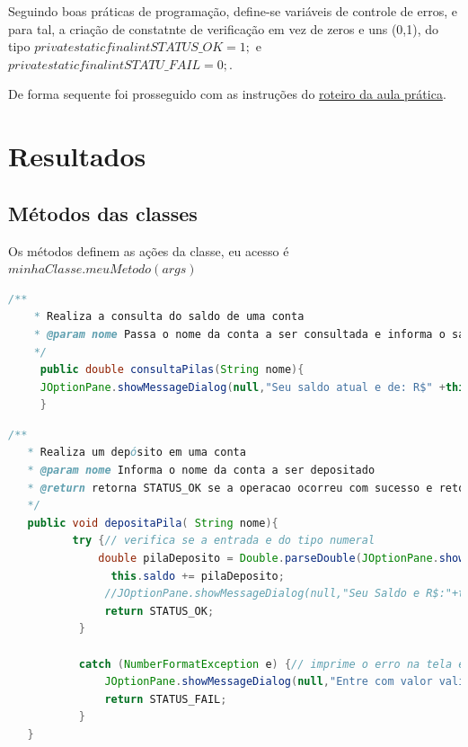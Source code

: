 \par Seguindo boas práticas de programação, define-se variáveis de controle de erros, e para tal, a criação de constatnte de verificação em vez de zeros e uns (0,1), do tipo $private static final int  STATUS\_OK = 1;$ e $private static final int STATU\_FAIL = 0;$.
\par De forma sequente foi prosseguido com as instruções do \href{https://github.com/OgliariNatan/gerenciaBanco/blob/main/Aula%20pr%C3%A1tica.pdf}{roteiro da aula prática}.

\section{Resultados}






\subsection{Métodos das classes}

\par Os métodos definem as ações da classe, eu acesso é $minhaClasse.meuMetodo(args)$

\begin{lstlisting}[language=Java, caption=consultaPilas, label=consultaPilas]
    /**
    * Realiza a consulta do saldo de uma conta
    * @param nome Passa o nome da conta a ser consultada e informa o saldo ao cliente.
    */
     public double consultaPilas(String nome){
     JOptionPane.showMessageDialog(null,"Seu saldo atual e de: R$" +this.saldo, this.nome+" "+this.sobrenome, JOptionPane.INFORMATION_MESSAGE, icon);
     }

\end{lstlisting}

\begin{lstlisting}[language=Java, caption=depositoPilas, label=depositaPilas]
  /**
   * Realiza um depósito em uma conta
   * @param nome Informa o nome da conta a ser depositado
   * @return retorna STATUS_OK se a operacao ocorreu com sucesso e retorna STATUS_FAIL se ocorrer um erro
   */
   public void depositaPila( String nome){
          try {// verifica se a entrada e do tipo numeral
              double pilaDeposito = Double.parseDouble(JOptionPane.showInputDialog(null,"Informe a quantidade em Reais (R$) a ser depositado na conta do "+this.nome+" "+this.sobrenome));
                this.saldo += pilaDeposito;
               //JOptionPane.showMessageDialog(null,"Seu Saldo e R$:"+this.consultaPilas(this.nome)+" Reais", this.nome, JOptionPane.INFORMATION_MESSAGE, icon);
               return STATUS_OK;
           }

           catch (NumberFormatException e) {// imprime o erro na tela e informa o que foi digitado.
               JOptionPane.showMessageDialog(null,"Entre com valor valido, do tipo numeral.\n Use (.) ponto em vez de (,) virgula\n ERRO: " + e.getMessage()  , "ERRO", JOptionPane.ERROR_MESSAGE);
               return STATUS_FAIL;
           }
   }
\end{lstlisting}


